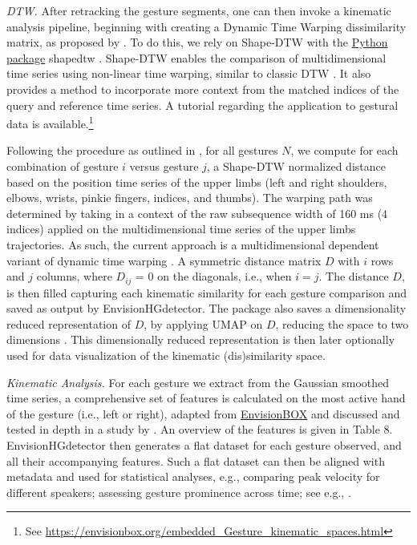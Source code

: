 \documentclass[11pt,smallheadings,cleardoublepage=empty,tocflat,numbers=noenddot,twoside,captions=tableheading]{scrbook}
\begin{document}
\begin{refsection}
\emph{DTW.} 
After retracking the gesture segments, one can then invoke a kinematic analysis pipeline, beginning with creating a Dynamic Time Warping \parencite{giorginoComputingVisualizingDynamic2009} dissimilarity matrix, as proposed by \citet{pouwGestureNetworksIntroducing2019}. To do this, we rely on Shape-DTW \parencite{zhaoShapeDTWShapeDynamic2016} with the \href{https://github.com/MikolajSzafraniecUPDS/shapedtw-python}{Python package} shapedtw \parencite{szafraniecMikolajSzafraniecUPDSShapedtwpython2025}. Shape-DTW enables the comparison of multidimensional time series using non-linear time warping, similar to classic DTW \parencite{giorginoComputingVisualizingDynamic2009a}. It also provides a method to incorporate more context from the matched indices of the query and reference time series. A tutorial regarding the application to gestural data is available.\footnote{See \url{https://envisionbox.org/embedded_Gesture_kinematic_spaces.html}}

Following the procedure as outlined in \citet{pouwGestureNetworksIntroducing2019}, for all gestures \( N \), we compute for each combination of gesture \( i \) versus gesture \( j \), a Shape-DTW normalized distance based on the position time series of the upper limbs (left and right shoulders, elbows, wrists, pinkie fingers, indices, and thumbs). The warping path was determined by taking in a context of the raw subsequence width of 160 ms (4 indices) applied on the multidimensional time series of the upper limbs trajectories. As such, the current approach is a multidimensional dependent variant of dynamic time warping \parencite{giorginoComputingVisualizingDynamic2009}. A symmetric distance matrix \( D \) with \( i \) rows and \( j \) columns, where \( D_{ij} \) = 0 on the diagonals, i.e., when \( i = j \). The distance \( D \), is then filled capturing each kinematic similarity for each gesture comparison and saved as output by EnvisionHGdetector. The package also saves a dimensionality reduced representation of  \( D \), by applying UMAP on \( D \), reducing the space to two dimensions \parencite{mcinnesUMAPUniformManifold2020}. This dimensionally reduced representation is then later optionally used for data visualization of the kinematic (dis)similarity space.

\emph{Kinematic Analysis.} 
For each gesture we extract from the Gaussian smoothed time series, a comprehensive set of features is calculated on the most active hand of the gesture (i.e., left or right), adapted from \href{https://envisionbox.org/embedded_Analysis_kinematic_features_module.html}{EnvisionBOX} and discussed and tested in depth in a study by  \citet{trujilloMarkerlessAutomaticAnalysis2019}. An overview of the features is given in Table 8. EnvisionHGdetector then generates a flat dataset for each gesture observed, and all their accompanying features. Such a flat dataset can then be aligned with metadata and used for statistical analyses, e.g., comparing peak velocity for different speakers; assessing gesture prominence across time; see e.g., \citet{rasenbergMultimodalNatureCommunicative2022, pouwSystematicInvestigationGesture2021, trujilloCommunicativeIntentModulates2018}. 


\end{refsection}
\end{document}
